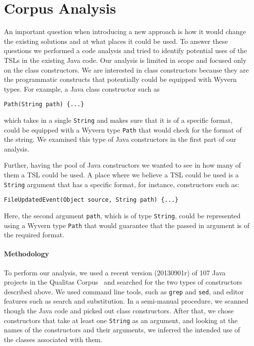 \section{Corpus Analysis}
\label{s:study}

An important question when introducing a new approach is how it would change the existing solutions and at what places it could be used. To answer these questions we performed a code analysis and tried to identify potential uses of the TSLs in the existing Java code. Our analysis is limited in scope and focused only on the class constructors. We are interested in class constructors because they are the programmatic constructs that potentially could be equipped with Wyvern types. For example, a Java class constructor such as 

\begin{lstlisting}
Path(String path) {...}
\end{lstlisting}

\noindent which takes in a single \lstinline{String} and makes sure that it is of a specific format, could be equipped with a Wyvern type \lstinline{Path} that would check for the format of the string. We examined this type of Java constructors in the first part of our analysis.

Further, having the pool of Java constructors we wanted to see in how many of them a TSL could be used. A place where we believe a TSL could be used is a \lstinline{String} argument that has a specific format, for instance, constructors such as:

\begin{lstlisting}
FileUpdatedEvent(Object source, String path) {...}
\end{lstlisting}

\noindent Here, the second argument \lstinline{path}, which is of type \lstinline{String}, could be represented using a Wyvern type \lstinline{Path} that would guarantee that the passed in argument is of the required format.

\paragraph{Methodology}

To perform our analysis, we used a recent version (20130901r) of 107 Java projects in the Qualitas Corpus~\cite{QualitasCorpus:APSEC:2010} and searched for the two types of constructors described above. We used command line tools, such as \lstinline{grep} and \lstinline{sed}, and editor features such as search and substitution. In a semi-manual procedure, we scanned though the Java code and picked out class constructors. After that, we chose constructors that take at least one \lstinline{String} as an argument, and looking at the names of the constructors and their arguments, we inferred the intended use of the classes associated with them.

